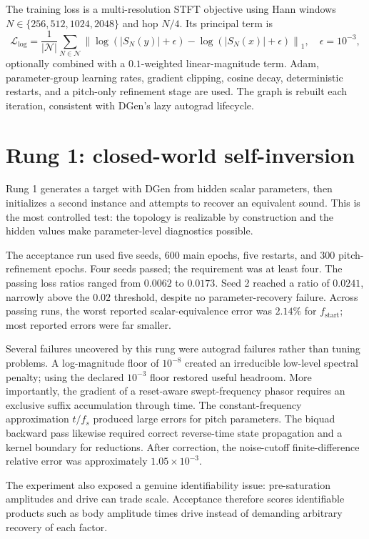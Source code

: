 \documentclass[10pt]{article}
\begin{document}
The training loss is a multi-resolution STFT objective using Hann windows $N\in\{256,512,1024,2048\}$ and hop $N/4$. Its principal term is
\begin{equation}
\mathcal{L}_{\log}=\frac{1}{|\mathcal{N}|}\sum_{N\in\mathcal{N}}
\left\|\log\!\left(|S_N(y)|+\epsilon\right)-
\log\!\left(|S_N(x)|+\epsilon\right)\right\|_1,
\quad \epsilon=10^{-3},
\end{equation}
optionally combined with a $0.1$-weighted linear-magnitude term. Adam, parameter-group learning rates, gradient clipping, cosine decay, deterministic restarts, and a pitch-only refinement stage are used. The graph is rebuilt each iteration, consistent with DGen's lazy autograd lifecycle.

\section{Rung 1: closed-world self-inversion}

Rung 1 generates a target with DGen from hidden scalar parameters, then initializes a second instance and attempts to recover an equivalent sound. This is the most controlled test: the topology is realizable by construction and the hidden values make parameter-level diagnostics possible.

The acceptance run used five seeds, 600 main epochs, five restarts, and 300 pitch-refinement epochs. Four seeds passed; the requirement was at least four. The passing loss ratios ranged from $0.0062$ to $0.0173$. Seed 2 reached a ratio of $0.0241$, narrowly above the $0.02$ threshold, despite no parameter-recovery failure. Across passing runs, the worst reported scalar-equivalence error was $2.14\%$ for $f_{\mathrm{start}}$; most reported errors were far smaller.

Several failures uncovered by this rung were autograd failures rather than tuning problems. A log-magnitude floor of $10^{-8}$ created an irreducible low-level spectral penalty; using the declared $10^{-3}$ floor restored useful headroom. More importantly, the gradient of a reset-aware swept-frequency phasor requires an exclusive suffix accumulation through time. The constant-frequency approximation $t/f_s$ produced large errors for pitch parameters. The biquad backward pass likewise required correct reverse-time state propagation and a kernel boundary for reductions. After correction, the noise-cutoff finite-difference relative error was approximately $1.05\times10^{-3}$.

The experiment also exposed a genuine identifiability issue: pre-saturation amplitudes and drive can trade scale. Acceptance therefore scores identifiable products such as body amplitude times drive instead of demanding arbitrary recovery of each factor.
\end{document}
